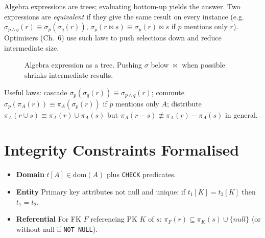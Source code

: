 Algebra expressions are trees; evaluating bottom-up yields the answer. Two expressions are \emph{equivalent} if they give the same result on every instance (e.g.\ $\sigma_{p\land q}(r)\equiv\sigma_p(\sigma_q(r))$, $\sigma_p(r\bowtie s)\equiv\sigma_p(r)\bowtie s$ if $p$ mentions only $r$). Optimisers (Ch.~6) use such laws to push selections down and reduce intermediate size.

\begin{figure}[h]
\centering
{}
\caption{Algebra expression as a tree. Pushing $\sigma$ below $\bowtie$ when possible shrinks intermediate results.}
\label{fig:expr-tree}
\end{figure}

Useful laws: cascade $\sigma_{p}(\sigma_{q}(r))\equiv\sigma_{p\land q}(r)$; commute $\sigma_p(\pi_A(r))\equiv\pi_A(\sigma_p(r))$ if $p$ mentions only $A$; distribute $\pi_A(r\cup s)\equiv\pi_A(r)\cup\pi_A(s)$ but $\pi_A(r-s)\not\equiv\pi_A(r)-\pi_A(s)$ in general.

\section{Integrity Constraints Formalised}
\label{sec:constraints}

\begin{itemize}
    \item \textbf{Domain} $t[A]\in\mathrm{dom}(A)$ plus \texttt{CHECK} predicates.
    \item \textbf{Entity} Primary key attributes not null and unique: if $t_1[K]=t_2[K]$ then $t_1=t_2$.
    \item \textbf{Referential} For FK $F$ referencing PK $K$ of $s$: $\pi_F(r)\subseteq \pi_K(s)\cup\{\mathit{null}\}$ (or without null if \texttt{NOT NULL}).
\end{itemize}


